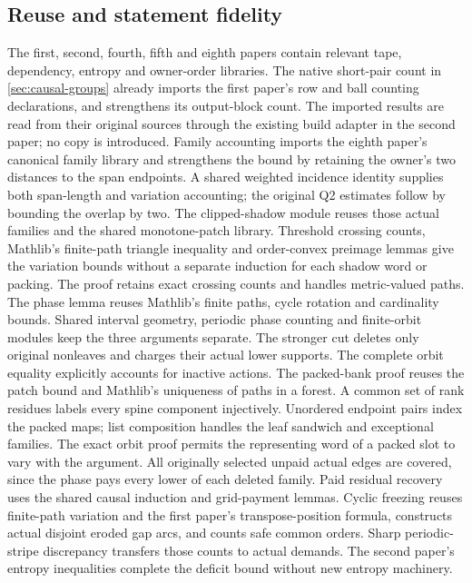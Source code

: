 \subsection{Reuse and statement fidelity}

The first, second, fourth, fifth and eighth papers contain relevant tape,
dependency, entropy and owner-order libraries. The native short-pair
count in \cref{sec:causal-groups} already imports the first paper's
row and ball counting declarations, and strengthens its output-block count.
The imported results are read from their original sources through
the existing build adapter in the second paper; no copy is introduced.
Family accounting imports the eighth paper's canonical family library
and strengthens the bound by retaining the owner's two distances to
the span endpoints. A shared weighted incidence identity supplies both
span-length and variation accounting; the original Q2 estimates follow
by bounding the overlap by two.
The clipped-shadow module reuses those actual families and the shared
monotone-patch library. Threshold crossing counts, Mathlib's finite-path
triangle inequality and order-convex preimage lemmas give the variation
bounds without a separate induction for each shadow word or packing.
The proof retains exact crossing counts and handles metric-valued paths.
The phase lemma reuses Mathlib's finite paths, cycle rotation and cardinality
bounds. Shared interval geometry, periodic phase counting and finite-orbit
modules keep the three arguments separate. The stronger cut deletes only
original nonleaves and charges their actual lower supports. The complete
orbit equality explicitly accounts for inactive actions.
The packed-bank proof reuses the patch bound and Mathlib's uniqueness of
paths in a forest. A common set of rank residues labels every spine
component injectively. Unordered endpoint pairs index the packed maps;
list composition handles the leaf sandwich and exceptional families.
The exact orbit proof permits the representing word of a packed slot to
vary with the argument. All originally selected unpaid actual edges are
covered, since the phase pays every lower of each deleted family.
Paid residual recovery uses the shared causal induction and grid-payment
lemmas. Cyclic freezing reuses finite-path variation and the first paper's
transpose-position formula, constructs actual disjoint eroded gap arcs,
and counts safe common orders. Sharp periodic-stripe discrepancy transfers
those counts to actual demands. The second paper's entropy inequalities
complete the deficit bound without new entropy machinery.

